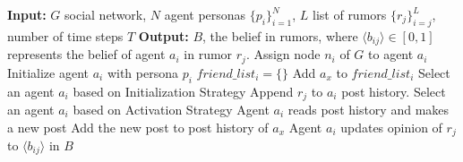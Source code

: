 
\begin{algorithm}
\footnotesize
\caption{Simulating Rumor Spread with LLM Agents
}
\begin{algorithmic}[1]
\State \textbf{Input:} $G$ social network, $N$ agent personas $\{p_{i}\}_{i=1}^{N}$, $L$ list of rumors $\{r_{j}\}_{i=j}^{L}$, number of time steps $T$
\State \textbf{Output:} $B$, the belief in rumors, where $\langle b_{ij} \rangle \in [0,1]$ represents the belief of agent $a_i$ in rumor $r_j$.
    \State Assign node $n_i$ of $G$ to agent $a_i$
    \State Initialize agent $a_i$ with persona $p_i$
    \State $friend\_list_i = \{\}$ 
        \State Add $a_x$ to $friend\_list_i$
    \EndFor
\EndFor
{}
    \State Select an agent $a_i$ based on Initialization Strategy
    \State Append $r_{j}$ to $a_i$ post history.
\EndFor
{}
    \State Select an agent $a_i$ based on Activation Strategy
    \State Agent $a_i$ reads post history and makes a new post
        \State Add the new post to post history of $a_x$
    \EndFor
        \State Agent $a_i$ updates opinion of $r_{j}$ to $\langle b_{ij} \rangle$ in $B$
    \EndFor
\EndFor
\end{algorithmic}
\label{alg:alg1}
\end{algorithm}




